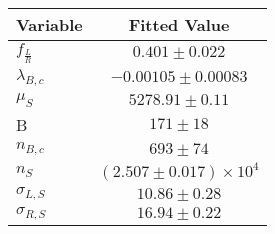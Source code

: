 \begin{tabular}[t]{lc}
\hline
Variable &Fitted Value\\
\hline\hline
$f_{\frac{L}{R}}$&$0.401\pm0.022$\\
\hline
$\lambda_{B,c}$&$-0.00105\pm0.00083$\\
\hline
$\mu_S$&$5278.91\pm0.11$\\
\hline
B&$171\pm18$\\
\hline
$n_{B,c}$&$693\pm74$\\
\hline
$n_S$&$(2.507\pm0.017)\times 10^4$\\
\hline
$\sigma_{L, S}$&$10.86\pm0.28$\\
\hline
$\sigma_{R, S}$&$16.94\pm0.22$\\
\hline
\end{tabular}